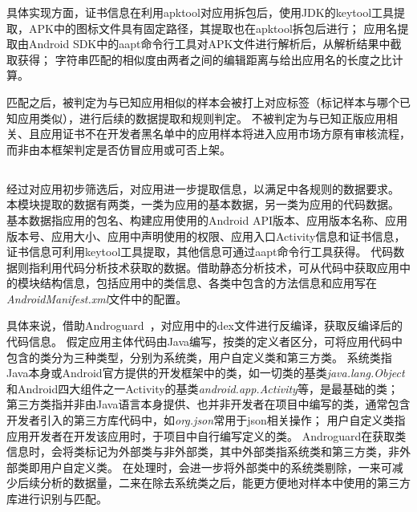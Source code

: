 具体实现方面，证书信息在利用apktool对应用拆包后，使用JDK的keytool工具提取，APK中的图标文件具有固定路径，其提取也在apktool拆包后进行；
应用名提取由Android SDK中的aapt命令行工具对APK文件进行解析后，从解析结果中截取获得；
字符串匹配的相似度由两者之间的编辑距离与给出应用名的长度之比计算。

匹配之后，被判定为与已知应用相似的样本会被打上对应标签（标记样本与哪个已知应用类似），进行后续的数据提取和规则判定。
不被\componentA 判定为与已知正版应用相关、且应用证书不在开发者黑名单中的应用样本将进入应用市场方原有审核流程，而非由本框架判定是否仿冒应用或可否上架。

\subsection{\componentB }

经过\componentA 对应用初步筛选后，\componentB 对应用进一步提取信息，以满足\componentC 中各规则的数据要求。
本模块提取的数据有两类，一类为应用的基本数据，另一类为应用的代码数据。
基本数据指应用的包名、构建应用使用的Android API版本、应用版本名称、应用版本号、应用大小、应用中声明使用的权限、应用入口Activity信息和证书信息，证书信息可利用keytool工具提取，其他信息可通过aapt命令行工具获得。
代码数据则指利用代码分析技术获取的数据。借助静态分析技术，\componentB 可从代码中获取应用中的模块结构信息，包括应用中的类信息、各类中包含的方法信息和应用写在\textit{AndroidManifest.xml}文件中的配置。

具体来说，\componentB 借助Androguard~\cite{Androguard}，对应用中的dex文件进行反编译，获取反编译后的代码信息。
假定应用主体代码由Java编写，按类的定义者区分，可将应用代码中包含的类分为三种类型，分别为系统类，用户自定义类和第三方类。
系统类指Java本身或Android官方提供的开发框架中的类，如一切类的基类\textit{java.lang.Object}和Android四大组件之一Activity的基类\textit{android.app.Activity}等，是最基础的类；
第三方类指并非由Java语言本身提供、也并非开发者在项目中编写的类，通常包含开发者引入的第三方库代码中，如\textit{org.json}常用于json相关操作；
用户自定义类指应用开发者在开发该应用时，于项目中自行编写定义的类。
Androguard在获取类信息时，会将类标记为外部类与非外部类，其中外部类指系统类和第三方类，非外部类即用户自定义类。
\componentB 在处理时，会进一步将外部类中的系统类剔除，一来可减少后续分析的数据量，二来在除去系统类之后，能更方便地对样本中使用的第三方库进行识别与匹配。

